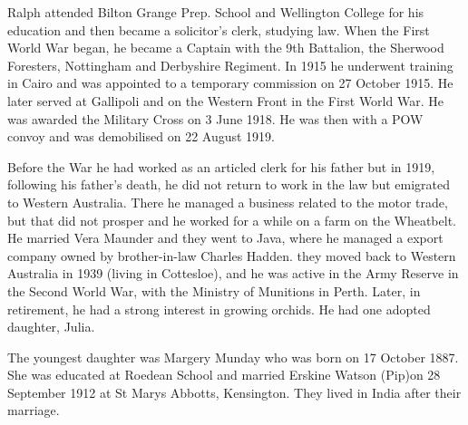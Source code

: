 Ralph attended Bilton Grange Prep. School and Wellington College for his education and then became a solicitor's clerk, studying law. When the First World War began, he became a Captain with the 9th Battalion, the Sherwood Foresters, Nottingham and Derbyshire Regiment. In 1915 he underwent training in Cairo and was appointed to a temporary commission on 27 October 1915. He later served at Gallipoli and on the Western Front in the First World War. He was awarded the Military Cross on 3 June 1918. He was then with a POW convoy and was demobilised on 22 August 1919.

Before the War he had worked as an articled clerk for his father but in 1919, following his father's death, he did not return to work in the law but emigrated to Western Australia.  There he managed a business related to the motor trade, but that did not prosper and he worked for a while on a farm on the Wheatbelt. He married Vera Maunder and they went to Java, where he managed a export company owned by brother-in-law Charles Hadden.  they moved back to Western Australia in 1939 (living in Cottesloe),  and he was active in the Army Reserve in the Second World War, with the Ministry of Munitions in Perth. Later, in retirement, he had a strong interest in growing orchids. He had one adopted daughter, Julia. 

The youngest daughter was Margery Munday who was born on 17 October 1887. She was educated at Roedean School
and married Erskine Watson (Pip)on 	28 September 1912 at St Marys Abbotts,	Kensington. They lived in India after their marriage.



